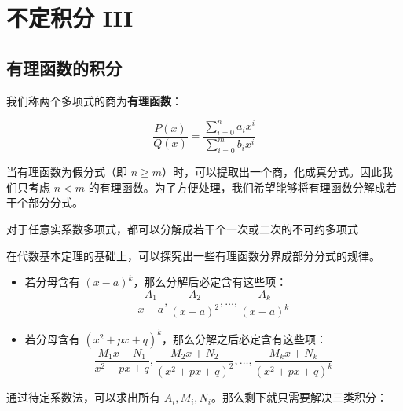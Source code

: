 \section{不定积分 III}

\subsection{有理函数的积分}

我们称两个多项式的商为\textbf{有理函数}：

$$
\frac{P(x)}{Q(x)} = \frac{\sum_{i=0}^n a_i x^i}{\sum_{i=0}^m b_i x^i}
$$

当有理函数为假分式（即 $n \ge m$）时，可以提取出一个商，化成真分式。因此我们只考虑 $n < m$ 的有理函数。为了方便处理，我们希望能够将有理函数分解成若干个部分分式。

\begin{theorem}[代数基本定理]
	对于任意实系数多项式，都可以分解成若干个一次或二次的不可约多项式
\end{theorem}

在代数基本定理的基础上，可以探究出一些有理函数分界成部分分式的规律。

\begin{itemize}
	\item 若分母含有 $(x - a)^k$，那么分解后必定含有这些项：
	$$
	\frac{A_1}{x - a}, \frac{A_2}{(x - a)^2}, \dots, \frac{A_k}{(x - a)^k}
	$$
	\item 若分母含有 $(x^2 + p x + q)^k$，那么分解之后必定含有这些项：
	$$
	\frac{M_1 x + N_1}{x^2 + p x + q}, \frac{M_2 x + N_2}{(x^2 + p x + q)^2}, \dots, \frac{M_k x + N_k}{(x^2 + p x + q)^k}
	$$
\end{itemize}

通过待定系数法，可以求出所有 $A_i, M_i, N_i$。那么剩下就只需要解决三类积分：

